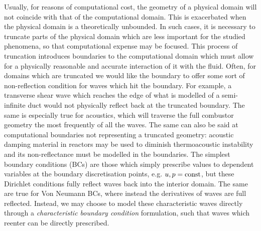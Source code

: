 Usually, for reasons of computational cost, the geometry of a physical domain will not coincide with that of the computational domain. This is exacerbated when the physical domain is a theoretically unbounded. In such cases, it is necessary to truncate parts of the physical domain which are less important for the studied phenomena, so that computational expense may be focused. This process of truncation introduces boundaries to the computational domain which must allow for a physically reasonable and accurate interaction of it with the fluid. Often, for domains which are truncated we would like the boundary to offer some sort of non-reflection condition for waves which hit the boundary. For example, a transverse shear wave which reaches the edge of what is modelled of a semi-infinite duct would not physically reflect back at the truncated boundary. The same is especially true for acoustics, which will traverse the full combustor geometry the most frequently of all the waves. The same can also be said at computational boundaries not representing a truncated geometry: acoustic damping material in reactors may be used to diminish thermoacoustic instability and its non-reflectance must be modelled in the boundaries. The simplest boundary conditions (BCs) are those which simply prescribe values to dependent variables at the boundary discretisation points, e.g. $u, p = \rm {const}$, but these Dirichlet conditions fully reflect waves back into the interior domain. The same are true for Von Neumann BCs, where instead the derivatives of waves are full reflected. Instead, we may choose to model these characteristic waves directly through a \emph{characteristic boundary condition} formulation, such that waves which reenter can be directly prescribed.



